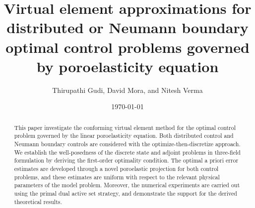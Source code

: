 \documentclass[smallextended]{svjour3}
\numberwithin{equation}{section}
\numberwithin{figure}{section}
\numberwithin{table}{section}
\begin{document}
	\title{Virtual element approximations for distributed or Neumann boundary optimal control problems governed by poroelasticity equation}
	\author{Thirupathi Gudi, David Mora, and Nitesh Verma}
	\date{\today}
	\maketitle
	
	\begin{abstract}
        This paper investigate the conforming virtual element method for the optimal control problem governed by the linear poroelasticity equation. Both distributed control and Neumann boundary controls are considered with the optimize-then-discretize approach. We establish the well-posedness of the discrete state and adjoint problems in three-field formulation by deriving the first-order optimality condition. The optimal a priori error estimates are developed through a novel poroelastic projection for both control problems, and these estimates are uniform with respect to the relevant physical parameters of the model problem. Moreover, the numerical experiments are carried out using the primal dual active set strategy, and demonstrate the support for the derived theoretical results.
	\end{abstract}
	
	
\end{document}

